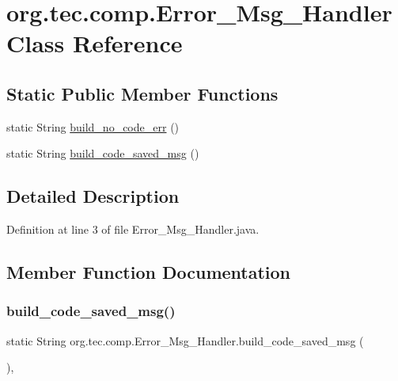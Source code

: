 \hypertarget{classorg_1_1tec_1_1comp_1_1_error___msg___handler}{}\section{org.\+tec.\+comp.\+Error\+\_\+\+Msg\+\_\+\+Handler Class Reference}
\label{classorg_1_1tec_1_1comp_1_1_error___msg___handler}
\subsection*{Static Public Member Functions}
\begin{DoxyCompactItemize}
\item 
static String \mbox{\hyperlink{classorg_1_1tec_1_1comp_1_1_error___msg___handler_a85a5bcc4fea0f63bb6f6950ac1011679}{build\+\_\+no\+\_\+code\+\_\+err}} ()
\item 
static String \mbox{\hyperlink{classorg_1_1tec_1_1comp_1_1_error___msg___handler_adcde095e03c05d805f3cb748bea42e16}{build\+\_\+code\+\_\+saved\+\_\+msg}} ()
\end{DoxyCompactItemize}


\subsection{Detailed Description}


Definition at line 3 of file Error\+\_\+\+Msg\+\_\+\+Handler.\+java.



\subsection{Member Function Documentation}
\mbox{\label{classorg_1_1tec_1_1comp_1_1_error___msg___handler_adcde095e03c05d805f3cb748bea42e16}} 
\subsubsection{\texorpdfstring{build\+\_\+code\+\_\+saved\+\_\+msg()}{build\_code\_saved\_msg()}}
{\footnotesize\ttfamily static String org.\+tec.\+comp.\+Error\+\_\+\+Msg\+\_\+\+Handler.\+build\+\_\+code\+\_\+saved\+\_\+msg (\begin{DoxyParamCaption}{ }\end{DoxyParamCaption})\hspace{0.3cm}{\ttfamily [inline]}, {\ttfamily [static]}}

